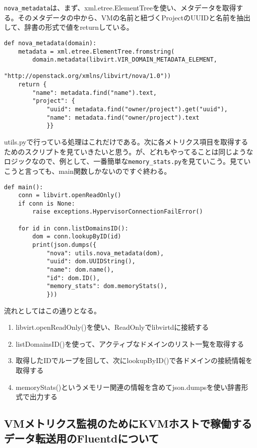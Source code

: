 \verb|nova_metadata|は、まず、xml.etree.ElementTreeを使い、メタデータを取得する。そのメタデータの中から、VMの名前と紐づくProjectのUUIDと名前を抽出して、辞書の形式で値をreturnしている。

\begin{lstlisting}
def nova_metadata(domain):
    metadata = xml.etree.ElementTree.fromstring(
        domain.metadata(libvirt.VIR_DOMAIN_METADATA_ELEMENT,
                        "http://openstack.org/xmlns/libvirt/nova/1.0"))
    return {
        "name": metadata.find("name").text,
        "project": {
            "uuid": metadata.find("owner/project").get("uuid"),
            "name": metadata.find("owner/project").text
            }}
\end{lstlisting}

utils.pyで行っている処理はこれだけである。次に各メトリクス項目を取得するためのスクリプトを見ていきたいと思う。が、どれもやってることは同じようなロジックなので、例として、一番簡単な\verb|memory_stats.py|を見ていこう。見ていこうと言っても、main関数しかないのですぐ終わる。

\begin{lstlisting}
def main():
    conn = libvirt.openReadOnly()
    if conn is None:
        raise exceptions.HypervisorConnectionFailError()

    for id in conn.listDomainsID():
        dom = conn.lookupByID(id)
        print(json.dumps({
            "nova": utils.nova_metadata(dom),
            "uuid": dom.UUIDString(),
            "name": dom.name(),
            "id": dom.ID(),
            "memory_stats": dom.memoryStats(),
            }))
\end{lstlisting}

流れとしてはこの通りとなる。

\begin{enumerate}
  \item libvirt.openReadOnly()を使い、ReadOnlyでlibvirtdに接続する
  \item listDomainsID()を使って、アクティブなドメインのリスト一覧を取得する
  \item 取得したIDでループを回して、次にlookupByID()で各ドメインの接続情報を取得する
  \item memoryStats()というメモリー関連の情報を含めてjson.dumpsを使い辞書形式で出力する
\end{enumerate}


\subsection{VMメトリクス監視のためにKVMホストで稼働するデータ転送用のFluentdについて}

